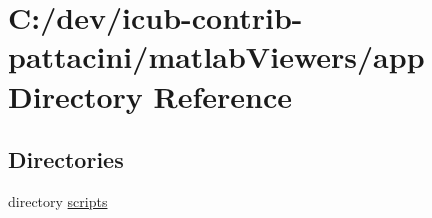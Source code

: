 \section{C\+:/dev/icub-\/contrib-\/pattacini/matlab\+Viewers/app Directory Reference}
\label{dir_58907555cfe8fb553a52e7c9a24e859c}
\subsection*{Directories}
\begin{DoxyCompactItemize}
\item 
directory \hyperlink{dir_726744940e22a7b0b0ba8b427aad03a6}{scripts}
\end{DoxyCompactItemize}
